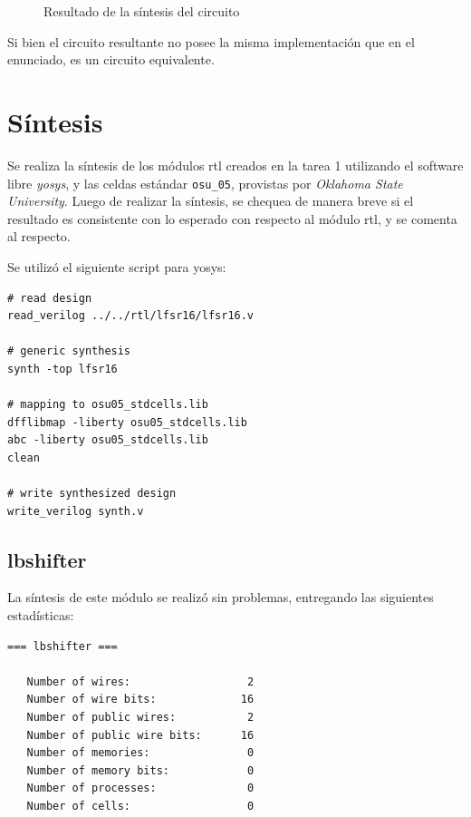 \documentclass[letterpaper, 12pt]{article}
\numberwithin{equation}{section}
\begin{document}
\begin{enumerate}
  \begin{figure}[H]
    \centering
    
    \caption{Resultado de la síntesis del circuito}
  \end{figure}

  Si bien el circuito resultante no posee la misma implementación que en el enunciado, es un circuito equivalente.

\end{enumerate}

\section{Síntesis}

Se realiza la síntesis de los módulos rtl creados en la tarea 1 utilizando el software libre \emph{yosys}, y las celdas estándar \texttt{osu\_05}, provistas por \emph{Oklahoma State University}. Luego de realizar  la síntesis, se chequea de manera breve si el resultado es consistente con lo esperado con respecto al módulo rtl, y se comenta al respecto.

Se utilizó el siguiente script para yosys:

\begin{verbatim}
# read design
read_verilog ../../rtl/lfsr16/lfsr16.v

# generic synthesis
synth -top lfsr16

# mapping to osu05_stdcells.lib
dfflibmap -liberty osu05_stdcells.lib
abc -liberty osu05_stdcells.lib
clean

# write synthesized design
write_verilog synth.v
\end{verbatim}

\subsection{lbshifter}

La síntesis de este módulo se realizó sin problemas, entregando las siguientes estadísticas:

\begin{verbatim}
=== lbshifter ===

   Number of wires:                  2
   Number of wire bits:             16
   Number of public wires:           2
   Number of public wire bits:      16
   Number of memories:               0
   Number of memory bits:            0
   Number of processes:              0
   Number of cells:                  0
\end{verbatim}
\end{document}
